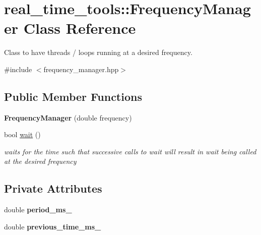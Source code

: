 \hypertarget{classreal__time__tools_1_1FrequencyManager}{}\section{real\+\_\+time\+\_\+tools\+:\+:Frequency\+Manager Class Reference}
\label{classreal__time__tools_1_1FrequencyManager}


Class to have threads / loops running at a desired frequency.  




{\ttfamily \#include $<$frequency\+\_\+manager.\+hpp$>$}

\subsection*{Public Member Functions}
\begin{DoxyCompactItemize}
\item 
\mbox{\label{classreal__time__tools_1_1FrequencyManager_a218f8a2651b453a89daa2968e2610032}} 
{\bfseries Frequency\+Manager} (double frequency)
\item 
bool \hyperlink{classreal__time__tools_1_1FrequencyManager_a3496f77c75f5ac8013b9f62345595e80}{wait} ()
\begin{DoxyCompactList}\small\item\em waits for the time such that successive calls to wait will result in wait being called at the desired frequency \end{DoxyCompactList}\end{DoxyCompactItemize}
\subsection*{Private Attributes}
\begin{DoxyCompactItemize}
\item 
\mbox{\label{classreal__time__tools_1_1FrequencyManager_ad32d927286a10fff1aefbb46d44748e1}} 
double {\bfseries period\+\_\+ms\+\_\+}
\item 
\mbox{\label{classreal__time__tools_1_1FrequencyManager_a42fa6ff042ee8de87d85b8875bd2723f}} 
double {\bfseries previous\+\_\+time\+\_\+ms\+\_\+}
\end{DoxyCompactItemize}


